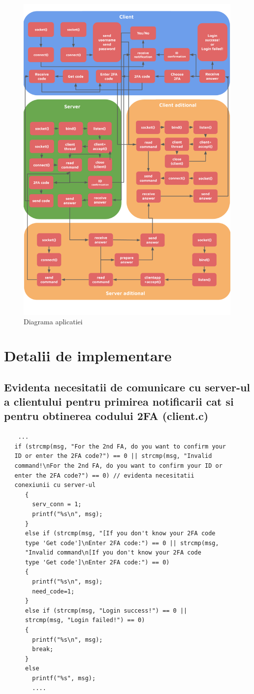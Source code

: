 \documentclass[runningheads]{llncs}
\begin{document}
\begin{figure}
\center \includegraphics[width=315pt]{diagrama}
\caption{Diagrama aplicatiei}
\end{figure}

\section{Detalii de implementare}
\subsection{Evidenta necesitatii de comunicare cu server-ul a clientului pentru primirea notificarii cat si pentru obtinerea codului 2FA (client.c)}
	\begin{verbatim}
	...
   if (strcmp(msg, "For the 2nd FA, do you want to confirm your 
   ID or enter the 2FA code?") == 0 || strcmp(msg, "Invalid 
   command!\nFor the 2nd FA, do you want to confirm your ID or
   enter the 2FA code?") == 0) // evidenta necesitatii 
   conexiunii cu server-ul
      {
        serv_conn = 1;
        printf("%s\n", msg);
      }
      else if (strcmp(msg, "[If you don't know your 2FA code 
      type 'Get code']\nEnter 2FA code:") == 0 || strcmp(msg,
      "Invalid command\n[If you don't know your 2FA code 
      type 'Get code']\nEnter 2FA code:") == 0)
      {
        printf("%s\n", msg);
        need_code=1;
      }
      else if (strcmp(msg, "Login success!") == 0 || 
      strcmp(msg, "Login failed!") == 0)
      {
        printf("%s\n", msg);
        break;
      }
      else
        printf("%s", msg);
        ....
\end{verbatim}
\end{document}
